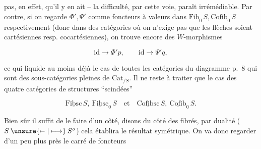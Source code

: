 pas, en effet, qu'il y en ait -- la difficulté, par cette voie, paraît irrémédiable. Par contre, si on regarde $\Phi',\Psi'$ comme foncteurs à valeurs dans $\underline{\mathrm{Fib}}_0\,S,\underline{\mathrm{Cofib}}_0\,S$ respectivement (donc dans des catégories où on n'exige pas que les flèches soient cartésiennes resp. cocartésiennes), on trouve encore des $W$-morphismes


\[
 \mathrm{id}\longrightarrow\Phi'p,\qquad \mathrm{id}\longrightarrow\Psi'q,
\]

ce qui liquide au moins déjà le cas de toutes les catégories du diagramme  p.~8 qui sont des sous-catégories pleines de $\mathrm{Cat}_{/S}$. Il ne reste  à traiter que le cas des quatre catégories de structures ``scindées''

\[
 \underline{\mathrm{Fibsc}}\,S,\ \underline{\mathrm{Fibsc}}_0\,S \quad\text{et}\quad \underline{\mathrm{Cofibsc}}\,S,\ \underline{\mathrm{Cofib}}_0\,S.
\]

Bien sûr il suffit de le faire d'un côté, disons du côté des fibrés, par dualité ($S\mathbin{\unsure{\mapstochar\relbar|\longmapsto}}S^o$) cela établira le résultat symétrique. On va donc regarder d'un peu plus près le carré de foncteurs


